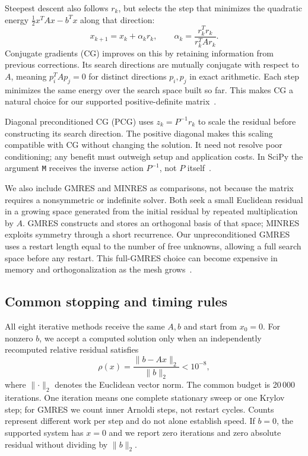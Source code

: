 Steepest descent also follows $r_k$, but selects the step that minimizes
the quadratic energy $\tfrac12 x^TAx-b^Tx$ along that direction:
\begin{equation}
 x_{k+1}=x_k+\alpha_k r_k,\qquad
 \alpha_k=\frac{r_k^Tr_k}{r_k^TAr_k}.
 \label{eq:solvers-sd}
\end{equation}
Conjugate gradients (CG) improves on this by retaining information from
previous corrections. Its search directions are mutually conjugate with
respect to $A$, meaning $p_i^TAp_j=0$ for distinct directions $p_i,p_j$
in exact arithmetic. Each step minimizes the same energy over the search
space built so far. This makes CG a natural choice for our supported
positive-definite matrix~\cite{saad-iterative}.

Diagonal preconditioned CG (PCG) uses $z_k=P^{-1}r_k$ to scale the residual
before constructing its search direction. The positive diagonal makes this scaling compatible with CG without
changing the solution. It need not resolve poor conditioning; any benefit
must outweigh setup and application costs. In SciPy the argument
\texttt{M} receives the inverse action $P^{-1}$, not $P$ itself~\cite{scipy-cg}.

We also include GMRES and MINRES as comparisons, not because the matrix
requires a nonsymmetric or indefinite solver. Both seek a small Euclidean
residual in a growing space generated from the initial residual by
repeated multiplication by $A$. GMRES constructs and stores an orthogonal
basis of that space; MINRES exploits symmetry through a short recurrence.
Our unpreconditioned GMRES uses a restart length equal to the number of
free unknowns, allowing a full search space before any restart. This
full-GMRES choice can become expensive in memory and orthogonalization
as the mesh grows~\cite{saad-iterative,scipy-gmres}.

\subsection{Common stopping and timing rules}
All eight iterative methods receive the same $A,b$ and start from $x_0=0$.
For nonzero $b$, we accept a computed solution only when an independently
recomputed relative residual satisfies
\begin{equation}
 \rho(x)=\frac{\lVert b-Ax\rVert_2}{\lVert b\rVert_2}<10^{-8},
 \label{eq:solvers-acceptance}
\end{equation}
where $\lVert\cdot\rVert_2$ denotes the Euclidean vector norm. The common
budget is 20\,000 iterations. One iteration means one complete stationary
sweep or one Krylov step; for GMRES we count inner Arnoldi steps, not
restart cycles. Counts represent different work per step and do not alone establish speed. If $b=0$, the supported
system has $x=0$ and we report zero iterations and zero absolute residual
without dividing by $\lVert b\rVert_2$.

